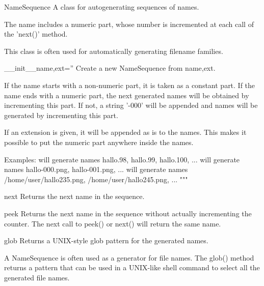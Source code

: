 \begin{classdesc}{NameSequence}{}
A class for autogenerating sequences of names.

The name includes a numeric part, whose number is incremented
at each call of the 'next()' method.

This class is often used for automatically generating filename families.
    
\begin{memberdesc}{__init__}{name,ext=''}
Create a new NameSequence from name,ext.

If the name starts with a non-numeric part, it is taken as a constant part.
If the name ends with a numeric part, the next generated names will
be obtained by incrementing this part.
If not, a string '-000' will be appended and names will be generated
by incrementing this part.

If an extension is given, it will be appended as is to the names.
This makes it possible to put the numeric part anywhere inside the
names.

Examples:
 will generate names hallo.98, hallo.99, hallo.100, ...
 will generate names hallo-000.png, hallo-001.png, ...
 will generate names
/home/user/hallo235.png, /home/user/hallo245.png, ...
"""
\end{memberdesc}

\begin{memberdesc}{next}
Returns the next name in the sequence.
\end{memberdesc}

\begin{memberdesc}{peek}
Returns the next name in the sequence without actually incrementing the counter.
The next call to peek() or next() will return the same name.
\end{memberdesc}

\begin{memberdesc}{glob}
Returns a UNIX-style glob pattern for the generated names.

A NameSequence is often used as a generator for file names.
The glob() method returns a pattern that can be used in a
UNIX-like shell command to select all the generated file names.
\end{memberdesc}
\end{classdesc}




